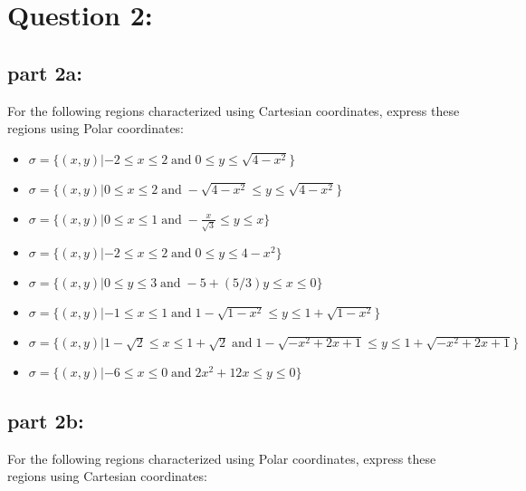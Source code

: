\documentclass{article}
\begin{document}
\section*{Question 2:}

\subsection*{part 2a:}

For the following regions characterized using Cartesian coordinates, express these regions using Polar coordinates:

\begin{itemize}
\item \(\sigma = \{(x,y) | -2 \leq x \leq 2 \;\text{and}\; 0 \leq y \leq \sqrt{4 - x^2}\}\)
\item \(\sigma = \{(x,y) | 0 \leq x \leq 2 \;\text{and}\; -\sqrt{4 - x^2} \leq y \leq \sqrt{4 - x^2}\}\)
\item \(\sigma = \{(x,y) | 0 \leq x \leq 1 \;\text{and}\; -\frac{x}{\sqrt{3}} \leq y \leq x\}\)
\item \(\sigma = \{(x,y) | -2 \leq x \leq 2 \;\text{and}\; 0 \leq y \leq 4 - x^2\}\)
\item \(\sigma = \{(x,y) | 0 \leq y \leq 3 \;\text{and}\; -5 + (5/3)y \leq x \leq 0\}\)
\item \(\sigma = \{(x,y) | -1 \leq x \leq 1 \;\text{and}\; 1 - \sqrt{1 - x^2} \leq y \leq 1 + \sqrt{1 - x^2}\}\)
\item \(\sigma = \{(x,y) | 1 - \sqrt{2} \leq x \leq 1 + \sqrt{2} \;\text{and}\; 1 - \sqrt{-x^2 + 2x + 1} \leq y \leq 1 + \sqrt{-x^2 + 2x + 1}\}\)
\item \(\sigma = \{(x,y) | -6 \leq x \leq 0 \;\text{and}\; 2x^2 + 12x \leq y \leq 0\}\)
\end{itemize}


\subsection*{part 2b:} 

For the following regions characterized using Polar coordinates, express these regions using Cartesian coordinates:
\end{document}
